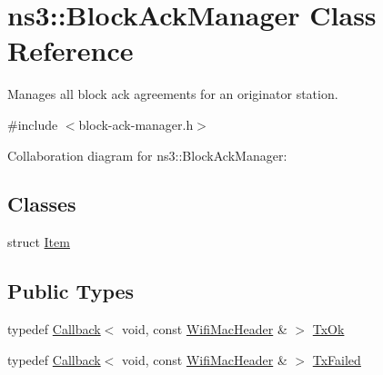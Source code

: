 \hypertarget{classns3_1_1BlockAckManager}{}\section{ns3\+:\+:Block\+Ack\+Manager Class Reference}
\label{classns3_1_1BlockAckManager}


Manages all block ack agreements for an originator station.  




{\ttfamily \#include $<$block-\/ack-\/manager.\+h$>$}



Collaboration diagram for ns3\+:\+:Block\+Ack\+Manager\+:
\subsection*{Classes}
\begin{DoxyCompactItemize}
\item 
struct \hyperlink{structns3_1_1BlockAckManager_1_1Item}{Item}
\end{DoxyCompactItemize}
\subsection*{Public Types}
\begin{DoxyCompactItemize}
\item 
typedef \hyperlink{classns3_1_1Callback}{Callback}$<$ void, const \hyperlink{classns3_1_1WifiMacHeader}{Wifi\+Mac\+Header} \& $>$ \hyperlink{classns3_1_1BlockAckManager_a982d21c899e65a7d1bdc181c8d6de2b4}{Tx\+Ok}
\item 
typedef \hyperlink{classns3_1_1Callback}{Callback}$<$ void, const \hyperlink{classns3_1_1WifiMacHeader}{Wifi\+Mac\+Header} \& $>$ \hyperlink{classns3_1_1BlockAckManager_a19b8dc1978e36f011ad60a91c1c7d09c}{Tx\+Failed}
\end{DoxyCompactItemize}
